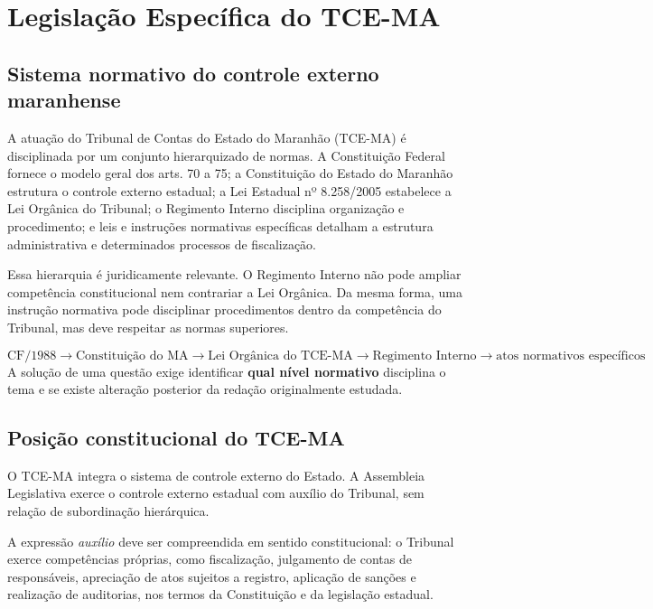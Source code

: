 \chapter{Legislação Específica do TCE-MA}

\section{Sistema normativo do controle externo maranhense}

A atuação do Tribunal de Contas do Estado do Maranhão (TCE-MA) é disciplinada por um conjunto hierarquizado de normas. A Constituição Federal fornece o modelo geral dos arts. 70 a 75; a Constituição do Estado do Maranhão estrutura o controle externo estadual; a Lei Estadual nº 8.258/2005 estabelece a Lei Orgânica do Tribunal; o Regimento Interno disciplina organização e procedimento; e leis e instruções normativas específicas detalham a estrutura administrativa e determinados processos de fiscalização.

Essa hierarquia é juridicamente relevante. O Regimento Interno não pode ampliar competência constitucional nem contrariar a Lei Orgânica. Da mesma forma, uma instrução normativa pode disciplinar procedimentos dentro da competência do Tribunal, mas deve respeitar as normas superiores.

\begin{teoria}
\[
\text{CF/1988}\rightarrow
\text{Constituição do MA}\rightarrow
\text{Lei Orgânica do TCE-MA}\rightarrow
\text{Regimento Interno}\rightarrow
\text{atos normativos específicos}
\]
A solução de uma questão exige identificar \textbf{qual nível normativo} disciplina o tema e se existe alteração posterior da redação originalmente estudada.
\end{teoria}

\section{Posição constitucional do TCE-MA}

O TCE-MA integra o sistema de controle externo do Estado. A Assembleia Legislativa exerce o controle externo estadual com auxílio do Tribunal, sem relação de subordinação hierárquica.

A expressão \emph{auxílio} deve ser compreendida em sentido constitucional: o Tribunal exerce competências próprias, como fiscalização, julgamento de contas de responsáveis, apreciação de atos sujeitos a registro, aplicação de sanções e realização de auditorias, nos termos da Constituição e da legislação estadual.

